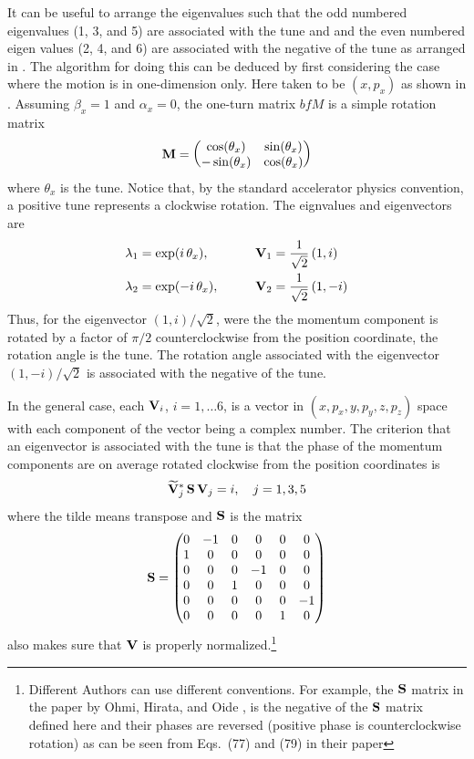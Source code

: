 It can be useful to arrange the eigenvalues such that the odd numbered eigenvalues (1, 3, and 5) are
associated with the tune and and the even numbered eigen values (2, 4, and 6) are associated with
the negative of the tune as arranged in . The algorithm for doing this can be deduced by
first considering the case where the motion is in one-dimension only. Here taken to be $(x, p_x)$ as
shown in . Assuming $\beta_x = 1$ and $\alpha_x = 0$, the one-turn matrix $bfM$ is a
simple rotation matrix
\begin{equation}
  {\bf M} = \begin{pmatrix}
    \cos(\theta_x) & \sin(\theta_x) \\
   -\sin(\theta_x) & \cos(\theta_x)
  \end{pmatrix}
\end{equation}
where $\theta_x$ is the tune. Notice that, by the standard accelerator physics convention, a
positive tune represents a clockwise rotation. The eignvalues and
eigenvectors are
\begin{alignat}{2}
  \lambda_1 &= \exp( i \, \theta_x),  \qquad &&{\bf V}_1 = \frac{1}{\sqrt{2}} \, (1, i) \nonumber \\
  \lambda_2 &= \exp(-i \, \theta_x),  \qquad &&{\bf V}_2 = \frac{1}{\sqrt{2}} \, (1, -i) 
\end{alignat}
Thus, for the eigenvector $(1, i)/\sqrt{2}$, were the the momentum component is rotated by a factor
of $\pi/2$ counterclockwise from the position coordinate, the rotation angle is the tune. The
rotation angle associated with the eigenvector $(1, -i)/\sqrt{2}$ is associated with the negative of
the tune.

In the general case, each ${\bf V}_i$, $i = 1, \ldots 6$, is a vector in $(x, p_x, y, p_y, z, p_z)$
space with each component of the vector being a complex number. The criterion that an eigenvector
is associated with the tune is that the phase of the momentum components are on average rotated
clockwise from the position coordinates is
\begin{equation}
  \widetilde{{\bf V}}_{j}^* \, {\bf S} \, {\bf V}_j = i, \quad j = 1, 3, 5
  \label{vsvi0}
\end{equation}
where the tilde means transpose and ${\bf S}$ is the matrix
\begin{equation}
  {\bf S} = \begin{pmatrix}
      0 & -1 &  0 &  0 &  0 &  0 \\
      1 &  0 &  0 &  0 &  0 &  0 \\
      0 &  0 &  0 & -1 &  0 &  0 \\
      0 &  0 &  1 &  0 &  0 &  0 \\
      0 &  0 &  0 &  0 &  0 & -1 \\
      0 &  0 &  0 &  0 &  1 &  0 \\
  \end{pmatrix}
\end{equation}
 also makes sure that ${\bf V}$ is properly normalized.\footnote
  {
Different Authors can use different conventions. For example, the ${\bf S}$ matrix in the paper by
Ohmi, Hirata, and Oide \cite{b:ohmi}, is the negative of the ${\bf S}$ matrix defined here and their
phases are reversed (positive phase is counterclockwise rotation) as can be seen from Eqs.~(77) and
(79) in their paper
  }

